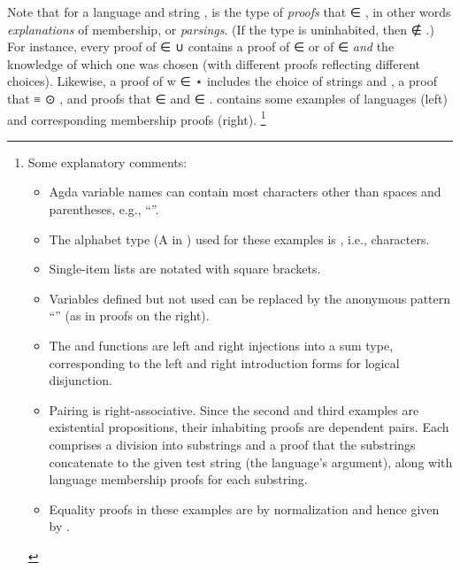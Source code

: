 \documentclass[acmsmall,screen,timestamp]{acmart}  %
\begin{document}
Note that for a language  and string , { } is the type of \emph{proofs} that { \AF ∈ }, in other words \emph{explanations} of membership, or \emph{parsings}.
(If the type { } is uninhabited, then { ∉ }.)
For instance, every proof of { \AF ∈  \AF ∪ } contains a proof of { \AF ∈ } or of { \AF ∈ } \emph{and} the knowledge of which one was chosen (with different proofs reflecting different choices).
Likewise, a proof of {w \AF ∈  \AF ⋆ } includes the choice of strings  and , a proof that { \AD ≡  \AF ⊙ }, and proofs that { \AF ∈ } and { \AF ∈ }.
\rnc{}
 contains some examples of languages (left) and corresponding membership proofs (right).%
\footnote{Some explanatory comments:
\begin{itemize}

\item Agda variable names can contain most characters other than spaces and parentheses, e.g., ``''.

\item The alphabet type (\AB A in ) used for these examples is , i.e., characters.

\item Single-item lists are notated with square brackets.

\item Variables defined but not used can be replaced by the anonymous pattern ``\AK{\_}'' (as in proofs on the right).

\item The  and  functions are left and right injections into a sum type, corresponding to the left and right introduction forms for logical disjunction.


\item Pairing is right-associative.
      Since the second and third examples are existential propositions, their inhabiting proofs are dependent pairs.
      Each comprises a division into substrings and a proof that the substrings concatenate to the given test string (the language's argument), along with language membership proofs for each substring.

\item Equality proofs in these examples are by normalization and hence given by .
\vspace{-2ex}%
\end{itemize}}
\end{document}
